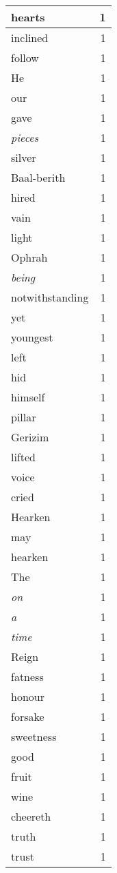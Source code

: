 \begin{center}
\begin{longtable}{l|r}
hearts & 1\\ \hline 
inclined & 1\\ \hline 
follow & 1\\ \hline 
He & 1\\ \hline 
our & 1\\ \hline 
gave & 1\\ \hline 
\emph{pieces} & 1\\ \hline 
silver & 1\\ \hline 
Baal-berith & 1\\ \hline 
hired & 1\\ \hline 
vain & 1\\ \hline 
light & 1\\ \hline 
Ophrah & 1\\ \hline 
\emph{being} & 1\\ \hline 
notwithstanding & 1\\ \hline 
yet & 1\\ \hline 
youngest & 1\\ \hline 
left & 1\\ \hline 
hid & 1\\ \hline 
himself & 1\\ \hline 
pillar & 1\\ \hline 
Gerizim & 1\\ \hline 
lifted & 1\\ \hline 
voice & 1\\ \hline 
cried & 1\\ \hline 
Hearken & 1\\ \hline 
may & 1\\ \hline 
hearken & 1\\ \hline 
The & 1\\ \hline 
\emph{on} & 1\\ \hline 
\emph{a} & 1\\ \hline 
\emph{time} & 1\\ \hline 
Reign & 1\\ \hline 
fatness & 1\\ \hline 
honour & 1\\ \hline 
forsake & 1\\ \hline 
sweetness & 1\\ \hline 
good & 1\\ \hline 
fruit & 1\\ \hline 
wine & 1\\ \hline 
cheereth & 1\\ \hline 
truth & 1\\ \hline 
trust & 1\\ \hline 

\end{longtable}
\end{center}
